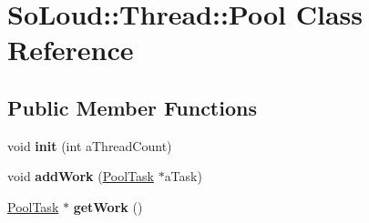 \hypertarget{class_so_loud_1_1_thread_1_1_pool}{}\section{So\+Loud\+::Thread\+::Pool Class Reference}
\label{class_so_loud_1_1_thread_1_1_pool}
\subsection*{Public Member Functions}
\begin{DoxyCompactItemize}
\item 
\mbox{\label{class_so_loud_1_1_thread_1_1_pool_a941c254d36737e2ba09b9076e9bbe0c6}} 
void {\bfseries init} (int a\+Thread\+Count)
\item 
\mbox{\label{class_so_loud_1_1_thread_1_1_pool_af5a6382384729d775638067e27704b1b}} 
void {\bfseries add\+Work} (\mbox{\hyperlink{class_so_loud_1_1_thread_1_1_pool_task}{Pool\+Task}} $\ast$a\+Task)
\item 
\mbox{\label{class_so_loud_1_1_thread_1_1_pool_a322f40272aa6f652b90294dc37529666}} 
\mbox{\hyperlink{class_so_loud_1_1_thread_1_1_pool_task}{Pool\+Task}} $\ast$ {\bfseries get\+Work} ()
\end{DoxyCompactItemize}
